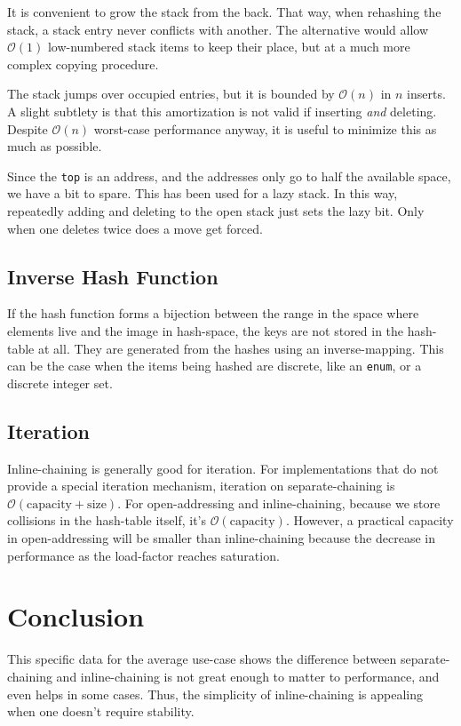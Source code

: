 \documentclass[12pt]{article}
\newcommand{\code}[1]{\colorbox{light-gray}{\texttt{#1}}}
\begin{document}
It is convenient to grow the stack from the back. That way, when rehashing the stack, a stack entry never conflicts with another. The alternative would allow $\mathcal{O}(1)$ low-numbered stack items to keep their place, but at a much more complex copying procedure.

The stack jumps over occupied entries, but it is bounded by $\mathcal{O}(n)$ in $n$ inserts. A slight subtlety is that this amortization is not valid if inserting {\it and} deleting. Despite $\mathcal{O}(n)$ worst-case performance anyway, it is useful to minimize this as much as possible.

Since the \code{top} is an address, and the addresses only go to half the available space, we have a bit to spare. This has been used for a lazy stack. In this way, repeatedly adding and deleting to the open stack just sets the lazy bit. Only when one deletes twice does a move get forced.

\subsection{Inverse Hash Function}

If the hash function forms a bijection between the range in the space where elements live and the image in hash-space, the keys are not stored in the hash-table at all. They are generated from the hashes using an inverse-mapping. This can be the case when the items being hashed are discrete, like an \code{enum}, or a discrete integer set.

\subsection{Iteration}

Inline-chaining is generally good for iteration. For implementations that do not provide a special iteration mechanism, iteration on separate-chaining is $\mathcal{O}(\text{capacity} + \text{size})$. For open-addressing and inline-chaining, because we store collisions in the hash-table itself, it's $\mathcal{O}(\text{capacity})$. However, a practical capacity in open-addressing will be smaller than inline-chaining because the decrease in performance as the load-factor reaches saturation.

\section{Conclusion}

This specific data for the average use-case shows the difference between separate-chaining and inline-chaining is not great enough to matter to performance, and even helps in some cases. Thus, the simplicity of inline-chaining is appealing when one doesn't require stability.


\end{document}
